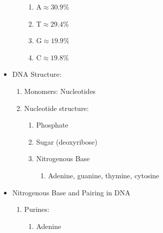 \documentclass[12pt]{article}
\begin{document}
\begin{itemize}
\begin{enumerate}
\begin{enumerate}
          \item A$\approx30.9\%$

          \item T$\approx29.4\%$

          \item G$\approx19.9\%$

          \item C$\approx19.8\%$

        \end{enumerate}

    \end{enumerate}

  \item DNA Structure:

    \begin{enumerate}

      \item Monomers: Nucleotides

      \item Nucleotide structure:

        \begin{enumerate}

          \item Phosphate

          \item Sugar (deoxyribose)

          \item Nitrogenous Base

            \begin{enumerate}

              \item Adenine, guanine, thymine, cytosine

            \end{enumerate}

        \end{enumerate}

    \end{enumerate}

  \item Nitrogenous Base and Pairing in DNA

    \begin{enumerate}

      \item Purines:

        \begin{enumerate}

          \item Adenine


\end{enumerate}
\end{enumerate}
\end{itemize}
\end{document}

